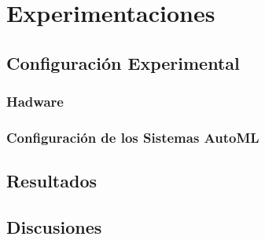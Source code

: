 \chapter{Experimentaciones}\label{chapter:experiments}
\section{Configuración Experimental}\label{section:seetings}
\subsection{Hadware}\label{section:hadware}
\subsection{Configuración de los Sistemas AutoML}\label{section:marcos}
\section{Resultados}\label{section:experiments}
\section{Discusiones}\label{section:discussions}